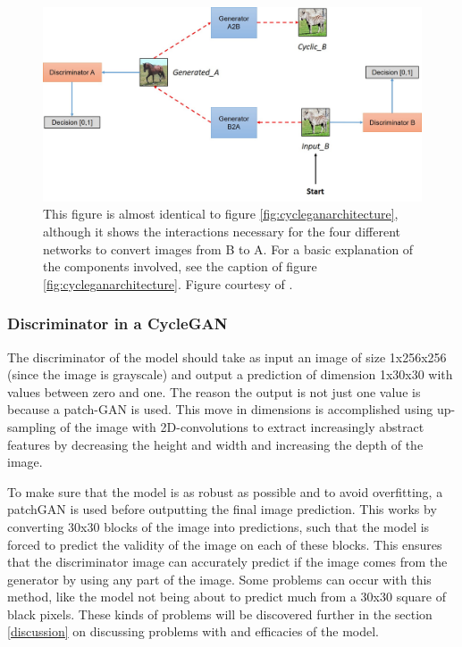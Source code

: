 \documentclass[11pt, fleqn, titlepage]{article}
\newcommand{\1}[1]{\mathds{1}\left[#1\right]}
\begin{document}
\begin{figure}[H]
	\centering
	\includegraphics[width=0.7\linewidth]{imgs/cyclegan_architecture2}
	\caption{This figure is almost identical to figure \ref{fig:cycleganarchitecture}, although it shows the interactions necessary for the four different networks to convert images from B to A. For a basic explanation of the components involved, see the caption of figure \ref{fig:cycleganarchitecture}. Figure courtesy of \cite{model_architecture}.}
	\label{fig:cycleganarchitecture2}
\end{figure}


\subsubsection{Discriminator in a CycleGAN}
The discriminator of the model should take as input an image of size 1x256x256 (since the image is grayscale) and output a prediction of dimension 1x30x30 with values between zero and one. The reason the output is not just one value is because a patch-GAN is used. This move in dimensions is accomplished using up-sampling of the image with 2D-convolutions to extract increasingly abstract features by decreasing the height and width and increasing the depth of the image.

To make sure that the model is as robust as possible and to avoid overfitting, a patchGAN is used before outputting the final image prediction. This works by converting 30x30 blocks of the image into predictions, such that the model is forced to predict the validity of the image on each of these blocks. This ensures that the discriminator image can accurately predict if the image comes from the generator by using any part of the image. Some problems can occur with this method, like the model not being about to predict much from a 30x30 square of black pixels. These kinds of problems will be discovered further in the section \ref{discussion} on discussing problems with and efficacies of the model.
\end{document}
